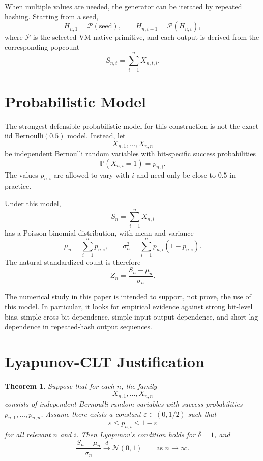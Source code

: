 \documentclass[11pt]{article}
\newtheorem{theorem}{Theorem}
\begin{document}
When multiple values are needed, the generator can be iterated by repeated
hashing. Starting from a seed,
\[
H_{n,1} = \mathcal{P}(\text{seed}),
\qquad
H_{n,t+1} = \mathcal{P}(H_{n,t}),
\]
where $\mathcal{P}$ is the selected VM-native primitive, and each output is
derived from the corresponding popcount
\[
S_{n,t} = \sum_{i=1}^{n} X_{n,t,i}.
\]

\section{Probabilistic Model}

The strongest defensible probabilistic model for this construction is not the
exact iid Bernoulli$(0.5)$ model. Instead, let
\[
X_{n,1}, \dots, X_{n,n}
\]
be independent Bernoulli random variables with bit-specific success
probabilities
\[
\mathbb{P}(X_{n,i}=1)=p_{n,i}.
\]
The values $p_{n,i}$ are allowed to vary with $i$ and need only be close to
$0.5$ in practice.

Under this model,
\[
S_n = \sum_{i=1}^n X_{n,i}
\]
has a Poisson-binomial distribution, with mean and variance
\[
\mu_n = \sum_{i=1}^n p_{n,i},
\qquad
\sigma_n^2 = \sum_{i=1}^n p_{n,i}(1-p_{n,i}).
\]
The natural standardized count is therefore
\[
Z_n = \frac{S_n - \mu_n}{\sigma_n}.
\]

The numerical study in this paper is intended to support, not prove, the use of
this model. In particular, it looks for empirical evidence against strong
bit-level bias, simple cross-bit dependence, simple input-output dependence, and
short-lag dependence in repeated-hash output sequences.

\section{Lyapunov-CLT Justification}

\begin{theorem}
Suppose that for each $n$, the family
\[
X_{n,1}, \dots, X_{n,n}
\]
consists of independent Bernoulli random variables with success probabilities
$p_{n,1}, \dots, p_{n,n}$. Assume there exists a constant
$\varepsilon \in (0, 1/2)$ such that
\[
\varepsilon \le p_{n,i} \le 1-\varepsilon
\]
for all relevant $n$ and $i$. Then Lyapunov's condition holds for $\delta=1$,
and
\[
\frac{S_n - \mu_n}{\sigma_n}
\xrightarrow{d}
\mathcal{N}(0,1)
\qquad \text{as } n \to \infty.
\]
\end{theorem}
\end{document}
